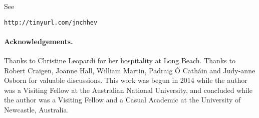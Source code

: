 \documentclass[12pt,a4paper]{article}
\begin{document}
See
\begin{verbatim}
http://tinyurl.com/jnchhev
\end{verbatim}
 

\paragraph*{Acknowledgements.}

Thanks to Christine Leopardi for her hospitality at Long Beach.
Thanks to Robert Craigen, Joanne Hall, William Martin,
Padraig {\'O} Cath{\'a}in and Judy-anne Osborn for valuable discussions.
This work was begun in 2014 while the author was a Visiting Fellow at the Australian National University, 
and concluded while the author was a Visiting Fellow and a Casual Academic at the University of Newcastle, Australia.




%

%

%
\end{document}

